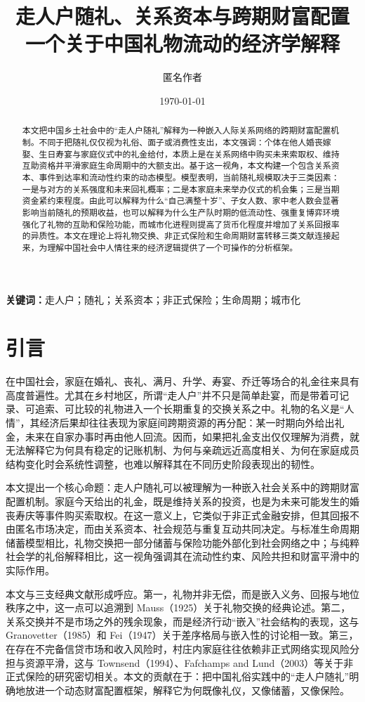 \documentclass[12pt,a4paper]{ctexart}
\title{走人户随礼、关系资本与跨期财富配置\\
\large 一个关于中国礼物流动的经济学解释}
\author{匿名作者}
\date{\today}
\begin{document}
\maketitle

\begin{abstract}
本文把中国乡土社会中的“走人户随礼”解释为一种嵌入人际关系网络的跨期财富配置机制。不同于把随礼仅仅视为礼俗、面子或消费性支出，本文强调：个体在他人婚丧嫁娶、生日寿宴与家庭仪式中的礼金给付，本质上是在关系网络中购买未来索取权、维持互助资格并平滑家庭生命周期中的大额支出。基于这一视角，本文构建一个包含关系资本、事件到达率和流动性约束的动态模型。模型表明，当前随礼规模取决于三类因素：一是与对方的关系强度和未来回礼概率；二是本家庭未来举办仪式的机会集；三是当期资金紧约束程度。由此可以解释为什么“自己满整十岁”、子女人数、家中老人数会显著影响当前随礼的预期收益，也可以解释为什么生产队时期的低流动性、强重复博弈环境强化了礼物的互助和保险功能，而城市化进程则提高了货币化程度并增加了关系回报率的异质性。本文在理论上将礼物交换、非正式保险和生命周期财富转移三类文献连接起来，为理解中国社会中人情往来的经济逻辑提供了一个可操作的分析框架。
\end{abstract}

\noindent\textbf{关键词：}走人户；随礼；关系资本；非正式保险；生命周期；城市化

\section{引言}

在中国社会，家庭在婚礼、丧礼、满月、升学、寿宴、乔迁等场合的礼金往来具有高度普遍性。尤其在乡村地区，所谓“走人户”并不只是简单赴宴，而是带着可记录、可追索、可比较的礼物进入一个长期重复的交换关系之中。礼物的名义是“人情”，其经济后果却往往表现为家庭间跨期资源的再分配：某一时期向外给出礼金，未来在自家办事时再由他人回流。因而，如果把礼金支出仅仅理解为消费，就无法解释它为何具有稳定的记账机制、为何与亲疏远近高度相关、为何在家庭成员结构变化时会系统性调整，也难以解释其在不同历史阶段表现出的韧性。

本文提出一个核心命题：走人户随礼可以被理解为一种嵌入社会关系中的跨期财富配置机制。家庭今天给出的礼金，既是维持关系的投资，也是为未来可能发生的婚丧寿庆等事件购买索取权。在这一意义上，它类似于非正式金融安排，但其回报不由匿名市场决定，而由关系资本、社会规范与重复互动共同决定。与标准生命周期储蓄模型相比，礼物交换把一部分储蓄与保险功能外部化到社会网络之中；与纯粹社会学的礼俗解释相比，这一视角强调其在流动性约束、风险共担和财富平滑中的实际作用。

本文与三支经典文献形成呼应。第一，礼物并非无偿，而是嵌入义务、回报与地位秩序之中，这一点可以追溯到 Mauss（1925）关于礼物交换的经典论述。第二，关系交换并不是市场之外的残余现象，而是经济行动“嵌入”社会结构的表现，这与 Granovetter（1985）和 Fei（1947）关于差序格局与嵌入性的讨论相一致。第三，在存在不完备信贷市场和收入风险时，村庄内家庭往往依赖非正式网络实现风险分担与资源平滑，这与 Townsend（1994）、Fafchamps and Lund（2003）等关于非正式保险的研究密切相关。本文的贡献在于：把中国礼俗实践中的“走人户随礼”明确地放进一个动态财富配置框架，解释它为何既像礼仪，又像储蓄，又像保险。
\end{document}
